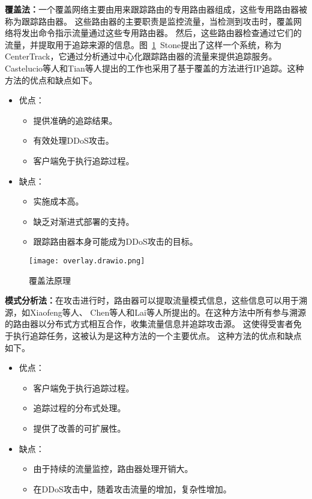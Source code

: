 \textbf{覆盖法：}一个覆盖网络主要由用来跟踪路由的专用路由器组成，这些专用路由器被称为跟踪路由器。
这些路由器的主要职责是监控流量，当检测到攻击时，覆盖网络将发出命令指示流量通过这些专用路由器。
然后，这些路由器检查通过它们的流量，并提取用于追踪来源的信息。图~\ref{fig:overlay}~Stone提出了这样一个系统，称为CenterTrack，它通过分析通过中心化跟踪路由器的流量来提供追踪服务\cite{stone2000centertrack}。
Castelucio等人\cite{castelucio2009aslevel}和Tian等人\cite{tian2011easytrace}提出的工作也采用了基于覆盖的方法进行IP追踪。这种方法的优点和缺点如下。
\begin{itemize}
  \item 优点：
  \begin{itemize}
    \item 提供准确的追踪结果。
    \item 有效处理DDoS攻击。
    \item 客户端免于执行追踪过程。
  \end{itemize}

  
  \item 缺点：
  \begin{itemize}
    \item 实施成本高。
    \item 缺乏对渐进式部署的支持。
    \item 跟踪路由器本身可能成为DDoS攻击的目标。 
  \end{itemize}

\end{itemize}

\begin{figure}[htbp]
  \centering
  \texttt{[image: overlay.drawio.png]}
  \caption{覆盖法原理}
  \label{fig:overlay}
\end{figure}

\textbf{模式分析法：}在攻击进行时，路由器可以提取流量模式信息，这些信息可以用于溯源，如Xiaofeng等人\cite{xiaofeng2004mechanism}、
Chen等人\cite{chen2006tracing}和Lai等人\cite{lai2008antbased}所提出的。在这种方法中所有参与溯源的路由器以分布式方式相互合作，收集流量信息并追踪攻击源。
这使得受害者免于执行追踪任务，这被认为是这种方法的一个主要优点。
这种方法的优点和缺点如下。
\begin{itemize}
  \item 优点：
    \begin{itemize}
      \item 客户端免于执行追踪过程。
      \item 追踪过程的分布式处理。
      \item 提供了改善的可扩展性。
    \end{itemize}
  \item 缺点：
    \begin{itemize}
      \item 由于持续的流量监控，路由器处理开销大。
      \item 在DDoS攻击中，随着攻击流量的增加，复杂性增加。
    \end{itemize}
\end{itemize}

